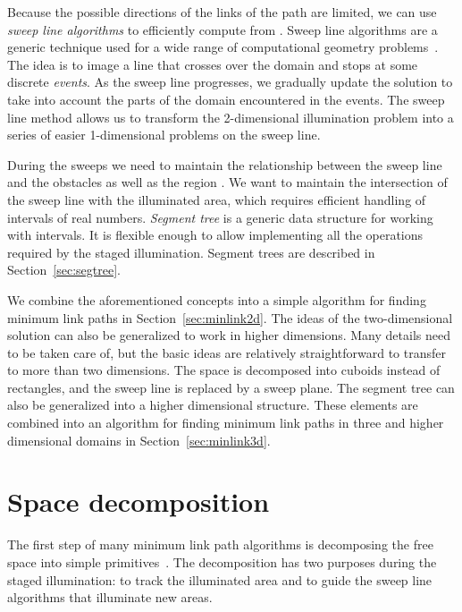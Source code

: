 \documentclass[english,gradu]{tktltiki2018}
\begin{document}
Because the possible directions of the links of the path are limited, we can use \emph{sweep line algorithms} to efficiently compute  from .
Sweep line algorithms are a generic technique used for a wide range of computational geometry problems~\cite[Section 33.2]{clrs}.
The idea is to image a line that crosses over the domain and stops at some discrete \emph{events}.
As the sweep line progresses, we gradually update the solution to take into account the parts of the domain encountered in the events.
The sweep line method allows us to transform the 2-dimensional illumination problem into a series of easier 1-dimensional problems on the sweep line.

During the sweeps we need to maintain the relationship between the sweep line and the obstacles as well as the region .
We want to maintain the intersection of the sweep line with the illuminated area, which requires efficient handling of intervals of real numbers.
\emph{Segment tree} is a generic data structure for working with intervals.
It is flexible enough to allow implementing all the operations required by the staged illumination.
Segment trees are described in Section~\ref{sec:segtree}.

We combine the aforementioned concepts into a simple algorithm for finding minimum link paths in Section~\ref{sec:minlink2d}.
The ideas of the two-dimensional solution can also be generalized to work in higher dimensions.
Many details need to be taken care of, but the basic ideas are relatively straightforward to transfer to more than two dimensions.
The space is decomposed into cuboids instead of rectangles, and the sweep line is replaced by a sweep plane.
The segment tree can also be generalized into a higher dimensional structure.
These elements are combined into an algorithm for finding minimum link paths in three and higher dimensional domains in Section~\ref{sec:minlink3d}.



\section{Space decomposition}\label{sec:decomposition}

The first step of many minimum link path algorithms is decomposing the free space into simple primitives~\cite{dasnar,imai86,revisited}.
The decomposition has two purposes during the staged illumination:
to track the illuminated area and to guide the sweep line algorithms that illuminate new areas.
\end{document}
